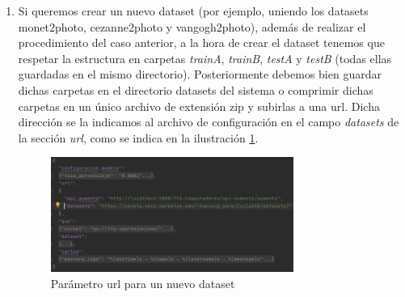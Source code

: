 \documentclass[../main.tex]{subfiles}
\begin{document}
\begin{itemize}
\begin{enumerate}
        \item Si queremos crear un nuevo dataset (por ejemplo, uniendo los datasets monet2photo, cezanne2photo y vangogh2photo), además de realizar el procedimiento del caso anterior, a la hora de crear el dataset tenemos que respetar la estructura en carpetas \textit{trainA}, \textit{trainB}, \textit{testA} y \textit{testB} (todas ellas guardadas en el mismo directorio). \newline
        Posteriormente debemos bien guardar dichas carpetas en el directorio datasets del sistema o comprimir dichas carpetas en un único archivo de extensión zip y subirlas a una url. Dicha dirección se la indicamos al archivo de configuración en el campo \textit{datasets} de la sección \textit{url}, como se indica en la ilustración \ref{fig:url_json}.
            \begin{figure}[h!]
            \centering
            \includegraphics[width=0.75\textwidth]{imagenes/url_json.png}
            \caption{Parámetro url para un nuevo dataset}
            \label{fig:url_json}
            \end{figure}
        
        \end{enumerate}
\end{itemize}
\end{document}
